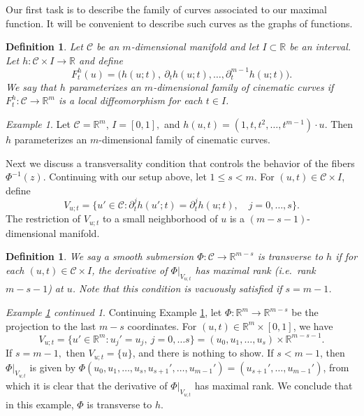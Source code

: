 \documentclass[letterpaper, reqno,11pt]{article}
\numberwithin{equation}{section}
\newcommand{\RR}{\mathbb{R}}
\numberwithin{thm}{section}
\newtheorem{defn}[thm]{Definition}
\theoremstyle{remark}
\newtheorem{example}[thm]{Example}
\newtheorem*{example1Contd}{Example \ref{runningExampleMomentCurve} continued}
\begin{document}
Our first task is to describe the family of curves associated to our maximal function. It will be convenient to describe such curves as the graphs of functions.
%
\begin{defn}\label{paramFamily}
Let $\mathcal{C}$ be an $m$-dimensional manifold and let $I\subset\RR$ be an interval. Let $h\colon \mathcal{C}\times I\to\RR$ and define 
\[
F^h_t(u)=\big(h(u;t),\ \partial_t h(u;t),\ldots,\partial_t^{m-1} h(u;t)\big).
\] 
We say that $h$ \emph{parameterizes an $m$-dimensional family of cinematic curves} if $F^h_t\colon \mathcal{C}\to\RR^m$ is a local diffeomorphism for each $t\in I$.
\end{defn}
%
\begin{example}\label{runningExampleMomentCurve}
Let $\mathcal{C} =  \RR^m$, $I = [0,1],$ and $h(u,t) =  (1, t, t^2,\ldots, t^{m-1})\cdot u.$ Then $h$ parameterizes an $m$-dimensional family of cinematic curves.
\end{example}
%
Next we discuss a transversality condition that controls the behavior of the fibers $\Phi^{-1}(z)$. Continuing with our setup above, let $1\leq s < m$. For $(u,t)\in \mathcal{C}\times I$, define
\begin{equation}\label{manifoldVut}
V_{u;t} = \{u'\in \mathcal{C}\colon \partial_t^j h(u';t)=\partial_t^j h(u;t),\quad j = 0,\ldots, s\}.
\end{equation}
The restriction of $V_{u;t}$ to a small neighborhood of $u$ is a $(m-s-1)$-dimensional manifold. 
\begin{defn}\label{defnQuantTranverse}
We say a smooth submersion $\Phi\colon \mathcal{C} \to\RR^{m-s}$ is \emph{transverse to $h$} if for each $(u,t)\in \mathcal{C}\times I$, the derivative of $\Phi|_{V_{u;t}}$ has maximal rank (i.e.~rank $m-s-1$) at $u$. Note that this condition is vacuously satisfied if $s=m-1$. 
\end{defn}
\begin{example1Contd}
Continuing Example \ref{runningExampleMomentCurve}, let $\Phi\colon \RR^m \to\RR^{m-s}$ be the projection to the last $m-s$ coordinates. For $(u,t)\in \RR^m\times [0,1]$, we have
\[
V_{u;t} = \{u'\in \RR^m \colon u_j'=u_j,\ j=0,\ldots s\}=(u_0,u_1,\ldots,u_s)\times\RR^{m-s-1}.
\]
If $s=m-1,$ then $V_{u;t} = \{u\}$, and there is nothing to show. If $s < m-1$, then $\Phi|_{V_{u;t}}$ is given by $\Phi(u_0,u_1,\ldots,u_s, u_{s+1}',\ldots,u_{m-1}') = (u_{s+1}',\ldots,u_{m-1}')$, from which it is clear that the derivative of $\Phi|_{V_{u;t}}$ has maximal rank. We conclude that in this example, $\Phi$ is transverse to $h$.
\end{example1Contd}
\end{document}
